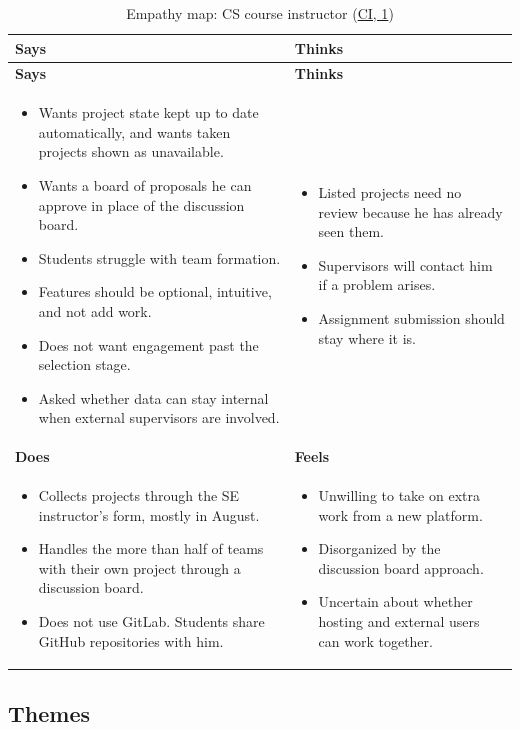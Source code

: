 \documentclass{article}
\newcommand{\intlink}[3]{\hyperref[int:#1-#2]{#3}}
\newcommand{\intref}[2]{\intlink{#1}{#2}{#1, #2}}
\newcommand{\empathymap}[6]{%
    \begin{longtable}{|p{0.465\textwidth}|p{0.465\textwidth}|}
    \caption{#1}\label{#2}\\
    \hline
    \textbf{Says} & \textbf{Thinks}\\ \hline
    \endfirsthead
    \hline
    \textbf{Says} & \textbf{Thinks}\\ \hline
    \endhead
    #3 & #4 \\ \hline
    \textbf{Does} & \textbf{Feels}\\ \hline
    #5 & #6 \\ \hline
    \end{longtable}}
\begin{document}
    \empathymap{Empathy map: CS course instructor (\intref{CI}{1})}{tab:map-ci}
    {\begin{itemize}
         \item Wants project state kept up to date automatically, and wants taken projects shown as unavailable.
         \item Wants a board of proposals he can approve in place of the discussion board.
         \item Students struggle with team formation.
         \item Features should be optional, intuitive, and not add work.
         \item Does not want engagement past the selection stage.
         \item Asked whether data can stay internal when external supervisors are involved.
    \end{itemize}}
    {\begin{itemize}
         \item Listed projects need no review because he has already seen them.
         \item Supervisors will contact him if a problem arises.
         \item Assignment submission should stay where it is.
    \end{itemize}}
    {\begin{itemize}
         \item Collects projects through the SE instructor's form, mostly in August.
         \item Handles the more than half of teams with their own project through a discussion board.
         \item Does not use GitLab. Students share GitHub repositories with him.
    \end{itemize}}
    {\begin{itemize}
         \item Unwilling to take on extra work from a new platform.
         \item Disorganized by the discussion board approach.
         \item Uncertain about whether hosting and external users can work together.
    \end{itemize}}

    \subsection{Themes}
    \label{sec:themes}
\end{document}
